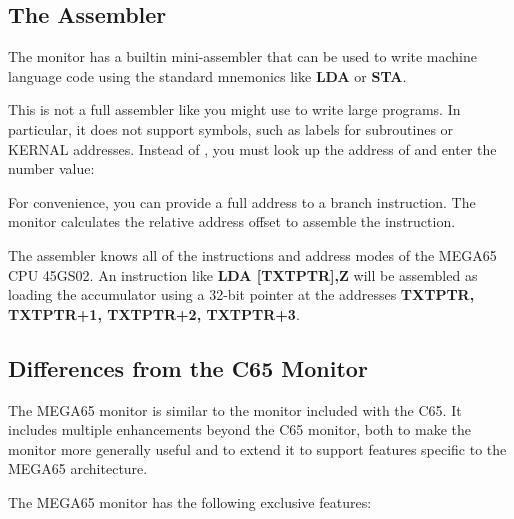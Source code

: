 \subsection{The Assembler}

The monitor has a builtin mini-assembler that can be used to write machine language code using the standard mnemonics like {\bf LDA} or {\bf STA}.

This is not a full assembler like you might use to write large programs. In particular, it does not support symbols, such as labels for subroutines or KERNAL addresses. Instead of {}, you must look up the address of {} and enter the number value: {}

For convenience, you can provide a full address to a branch instruction. The monitor calculates the relative address offset to assemble the instruction.

The assembler knows all of the instructions and address modes of the MEGA65
CPU 45GS02. An instruction like {\ttfamily \bf LDA [TXTPTR],Z}
will be assembled as loading the accumulator using a 32-bit pointer
at the addresses {\ttfamily \bf TXTPTR, TXTPTR+1, TXTPTR+2, TXTPTR+3}.

\subsection{Differences from the C65 Monitor}

The MEGA65 monitor is similar to the monitor included with the C65. It includes multiple enhancements beyond the C65 monitor, both to make the monitor more generally useful and to extend it to support features specific to the MEGA65 architecture.

The MEGA65 monitor has the following exclusive features:

